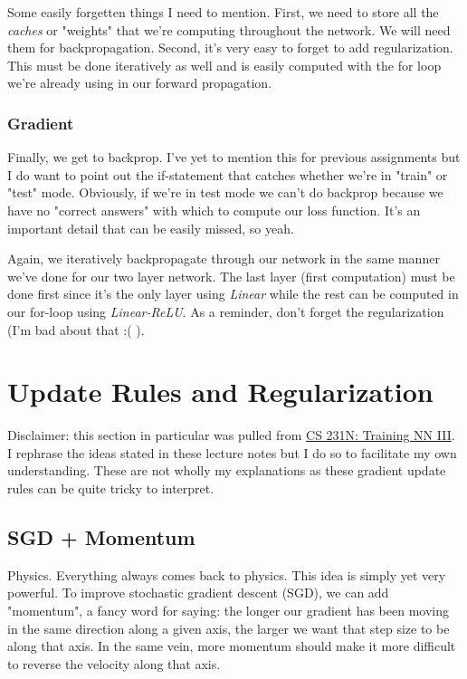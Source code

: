 \documentclass[12pt]{article}
\begin{document}
Some easily forgetten things I need to mention. First, we need to store all the \emph{caches} or 
"weights" that we're computing throughout the network. We will need them for backpropagation. Second, 
it's very easy to forget to add regularization. This must be done iteratively as well and is easily 
computed with the for loop we're already using in our forward propagation. 

\subsubsection{Gradient}
Finally, we get to backprop. I've yet to mention this for previous assignments but I do want to 
point out the if-statement that catches whether  we're in "train" or "test" mode. Obviously, if 
we're in test mode we can't do backprop because we have no "correct answers" with which to 
compute our loss function. It's an important detail that can be easily missed, so yeah. 

Again, we iteratively backpropagate through our network in the same manner we've done for our 
two layer network. The last layer (first computation) must be done first since it's the only 
layer using \emph{Linear} while the rest can be computed in our for-loop using \emph{Linear-ReLU}. 
As a reminder, don't forget the regularization (I'm bad about that :( ). 

\section{Update Rules and Regularization}

Disclaimer: this section in particular was pulled from \href{https://cs231n.github.io/neural-networks-3/#sgd}
{CS 231N: Training NN III}. I rephrase the ideas stated in these lecture notes but 
I do so to facilitate my own understanding. These are not wholly my explanations as these gradient update 
rules can be quite tricky to interpret. 
\subsection{SGD + Momentum}

Physics. Everything always comes back to physics. This idea is simply yet very powerful.
To improve stochastic gradient descent (SGD), we can add "momentum", a fancy word for saying: the
longer our gradient has been moving in the same direction along a given axis, the larger we 
want that step size to be along that axis. In the same vein, more momentum should make it more 
difficult to reverse the velocity along that axis. 
\end{document}
